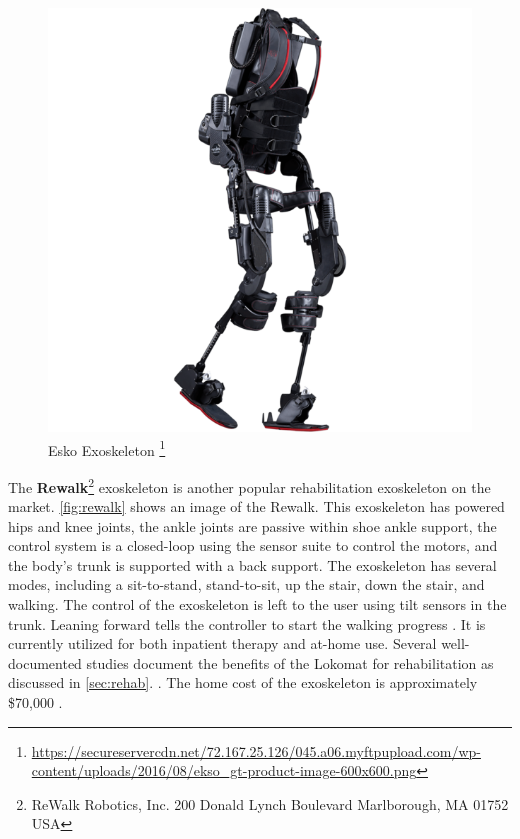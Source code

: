\begin{figure}
    \centering
    \includegraphics[scale=0.38]{images/background/ekso.png}
    \caption[Esko Exoskeleton]{Esko Exoskeleton \protect\footnote{\url{https://secureservercdn.net/72.167.25.126/045.a06.myftpupload.com/wp-content/uploads/2016/08/ekso_gt-product-image-600x600.png}}}
    \label{fig:esko}
\end{figure}


The \textbf{Rewalk}\footnote{ReWalk Robotics, Inc.
200 Donald Lynch Boulevard Marlborough, MA 01752
USA} exoskeleton is another popular rehabilitation exoskeleton on the market. \autoref{fig:rewalk} shows an image of the Rewalk. This exoskeleton has powered hips and knee joints,  the ankle joints are passive within shoe ankle support,  the control system is a closed-loop using the sensor suite to control the motors, and the body's trunk is supported with a back support. The exoskeleton has several modes, including a sit-to-stand, stand-to-sit, up the stair, down the stair, and walking. The control of the exoskeleton is left to the user using tilt sensors in the trunk. Leaning forward tells the controller to start the walking progress  \cite{zeilig2012safety}. It is currently utilized for both inpatient therapy and at-home use. Several well-documented studies document the benefits of the Lokomat for rehabilitation as discussed in \autoref{sec:rehab}. \cite{esquenazi2012rewalk}. The home cost of the exoskeleton is approximately \$70,000 \cite{wolff2014survey}. 


